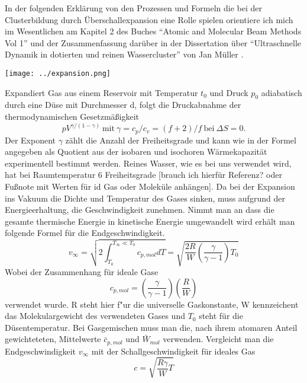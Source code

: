 In der folgenden Erklärung von den Prozessen und Formeln die bei der Clusterbildung durch Überschallexpansion eine Rolle spielen orientiere ich mich im Wesentlichen am Kapitel 2 des Buches \enquote{Atomic and Molecular Beam Methods Vol 1}\cite{scoles1988} und der Zusammenfassung darüber in der Dissertation über \enquote{Ultraschnelle Dynamik in dotierten und reinen Wassercluster} von Jan Müller \cite{mul13}.
\begin{center}
\begin{minipage}{\linewidth}
\centering
\texttt{[image: ../expansion.png]}%
 \label{fig:Machexpansion}
\end{minipage} 
\end{center} 
%
Expandiert Gas aus einem Reservoir mit Temperatur $t_0$ und Druck $p_0$ adiabatisch durch eine Düse mit Durchmesser d, folgt die Druckabnahme der thermodynamischen Gesetzmäßigkeit
\begin{equation}
pV^{\gamma/(1-\gamma)}\ \mbox{mit}\ \gamma=c_p/c_v=(f+2)/f \ \mbox{bei} \ \Delta S=0.
\end{equation}
%
Der Exponent $\gamma$ zählt die Anzahl der Freiheitsgrade und kann wie in der Formel angegeben als Quotient aus der isobaren und isochoren Wärmekapazität experimentell bestimmt werden. Reines Wasser, wie es bei uns verwendet wird, hat bei Raumtemperatur 6 Freiheitsgrade [brauch ich hierfür Referenz? oder Fußnote mit Werten für id Gas oder Moleküle anhängen]. 
Da bei der Expansion ins Vakuum die Dichte und Temperatur des Gases sinken, muss aufgrund der Energieerhaltung, die Geschwindigkeit zunehmen. 
Nimmt man an dass die gesamte thermische Energie in kinetische Energie umgewandelt wird erhält man folgende Formel für die Endgeschwindigkeit.
\begin{equation}
v_\infty=\sqrt{2\int_{T_0}^{T_\infty \ll T_0} c_{p,mol}dT}= \sqrt{\frac{2R}{W}\left(\frac{\gamma}{\gamma-1}\right)T_0}
\end{equation}
%
Wobei der Zusammenhang für ideale Gase
\begin{equation}
c_{p,mol}= \left(\frac{\gamma}{\gamma-1}\right)\left(\frac{R}{W}\right)
\end{equation}
%
verwendet wurde. R steht hier f"ur die universelle Gaskonstante, W kennzeichent das Molekulargewicht des verwendeten Gases und $T_0$ steht für die Düsentemperatur.
Bei Gasgemischen muss man die, nach ihrem atomaren Anteil gewichteteten, Mittelwerte $\bar{c}_{p,mol}$ und $\bar{W}_{mol}$ verwenden.
Vergleicht man die Endgeschwindigkeit $v_{\infty}$ mit der Schallgeschwindigkeit für ideales Gas
\begin{equation}
c=\sqrt{\frac{R \gamma}{W}T}
\end{equation}

